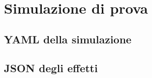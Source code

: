 
\appendix
    \chapter{Simulazione di prova}\label{app:test}
        \section{YAML della simulazione}\label{app:yaml}
            
            \clearpage
        \section{JSON degli effetti}\label{app:json}
            



